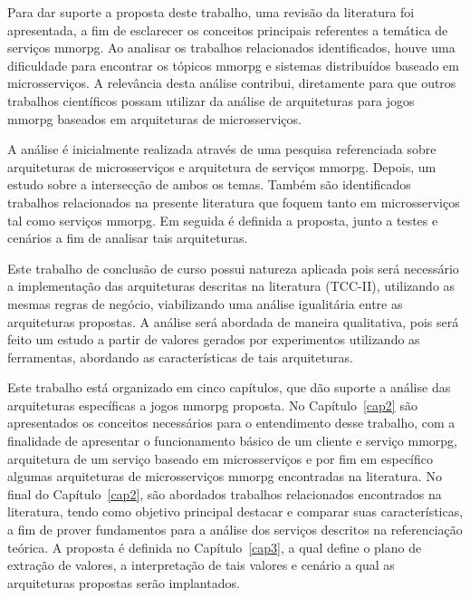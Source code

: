 Para dar suporte a proposta deste trabalho, uma revisão da literatura foi apresentada, a fim de esclarecer os conceitos principais referentes a temática de serviços \ac{mmorpg}.
%
Ao analisar os trabalhos relacionados identificados, houve uma dificuldade para encontrar os tópicos \ac{mmorpg} e sistemas distribuídos baseado em microsserviços.
%
A relevância desta análise contribui, diretamente para que outros trabalhos científicos possam utilizar da análise de arquiteturas para jogos \ac{mmorpg} baseados em arquiteturas de microsserviços.



A análise é inicialmente realizada através de uma pesquisa referenciada sobre arquiteturas de microsserviços e arquitetura de serviços \ac{mmorpg}.
%
Depois, um estudo sobre a intersecção de ambos os temas.
%
Também são identificados trabalhos relacionados na presente literatura que foquem tanto em microsserviços tal como serviços \ac{mmorpg}.
%
Em seguida é definida a proposta, junto a testes e cenários a fim de analisar tais arquiteturas. 



Este trabalho de conclusão de curso possui natureza aplicada pois será necessário a implementação das arquiteturas descritas na literatura (TCC-II), utilizando as mesmas regras de negócio, viabilizando uma análise igualitária entre as arquiteturas propostas.
%
A análise será abordada de maneira qualitativa, pois será feito um estudo a partir de valores gerados por experimentos utilizando as ferramentas, abordando as características de tais arquiteturas.



Este trabalho está organizado em cinco capítulos, que dão suporte a análise das arquiteturas específicas a jogos \ac{mmorpg} proposta.
%
No Capítulo~\ref{cap2} são apresentados os conceitos necessários para o entendimento desse trabalho, com a finalidade de apresentar o funcionamento básico de um cliente e serviço \ac{mmorpg}, arquitetura de um serviço baseado em microsserviços e por fim em específico algumas arquiteturas de microsserviços \ac{mmorpg} encontradas na literatura.
%
No final do Capítulo~\ref{cap2}, são abordados trabalhos relacionados encontrados na literatura, tendo como objetivo principal destacar e comparar suas características, a fim de prover fundamentos para a análise dos serviços descritos na referenciação teórica.
%
A proposta é definida no Capítulo~\ref{cap3}, a qual define o plano de extração de valores, a interpretação de tais valores e cenário a qual as arquiteturas propostas serão implantados.
%
